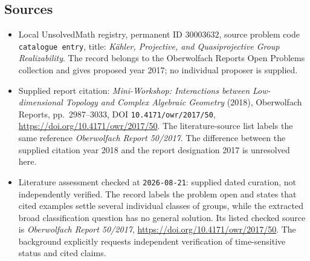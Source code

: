 \documentclass[11pt]{article}
\begin{document}
\subsection{Sources}
\begin{itemize}
\item Local UnsolvedMath registry, permanent ID \(30003632\), source problem code \texttt{catalogue entry}, title: \emph{Kähler, Projective, and Quasiprojective Group Realizability}. The record belongs to the Oberwolfach Reports Open Problems collection and gives proposed year 2017; no individual proposer is supplied.
\item Supplied report citation: \emph{Mini-Workshop: Interactions between Low-dimensional Topology and Complex Algebraic Geometry} (2018), Oberwolfach Reports, pp.~2987--3033, DOI \texttt{10.4171/owr/2017/50}, \url{https://doi.org/10.4171/owr/2017/50}. The literature-source list labels the same reference \emph{Oberwolfach Report 50/2017}. The difference between the supplied citation year 2018 and the report designation 2017 is unresolved here.
\item Literature assessment checked at \texttt{2026-08-21}: supplied dated curation, not independently verified. The record labels the problem open and states that cited examples settle several individual classes of groups, while the extracted broad classification question has no general solution. Its listed checked source is \emph{Oberwolfach Report 50/2017}, \url{https://doi.org/10.4171/owr/2017/50}. The background explicitly requests independent verification of time-sensitive status and cited claims.
\end{itemize}
\end{document}
